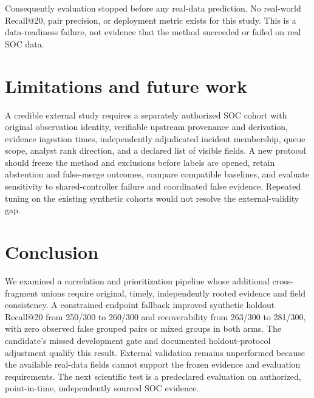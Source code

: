 Consequently evaluation stopped before any real-data prediction. No real-world Recall@20, pair precision, or deployment metric exists for this study. This is a data-readiness failure, not evidence that the method succeeded or failed on real SOC data.



\section{Limitations and future work}
A credible external study requires a separately authorized SOC cohort with original observation identity, verifiable upstream provenance and derivation, evidence ingestion times, independently adjudicated incident membership, queue scope, analyst rank direction, and a declared list of visible fields. A new protocol should freeze the method and exclusions before labels are opened, retain abstention and false-merge outcomes, compare compatible baselines, and evaluate sensitivity to shared-controller failure and coordinated false evidence. Repeated tuning on the existing synthetic cohorts would not resolve the external-validity gap.



\section{Conclusion}
We examined a correlation and prioritization pipeline whose additional cross-fragment unions require original, timely, independently rooted evidence and field consistency. A constrained endpoint fallback improved synthetic holdout Recall@20 from 250/300 to 260/300 and recoverability from 263/300 to 281/300, with zero observed false grouped pairs or mixed groups in both arms. The candidate's missed development gate and documented holdout-protocol adjustment qualify this result. External validation remains unperformed because the available real-data fields cannot support the frozen evidence and evaluation requirements. The next scientific test is a predeclared evaluation on authorized, point-in-time, independently sourced SOC evidence.




\appendices

